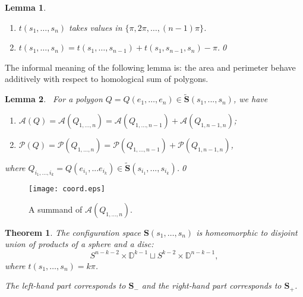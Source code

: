 \documentclass[12pt]{amsart}
\theoremstyle{plain}
\newtheorem{theorem}{Theorem}
\newtheorem{lemma}{Lemma}
\theoremstyle{definition}
\theoremstyle{remark}
\theoremstyle{plain}
\theoremstyle{definition}
\def\D{\mathbb{D}}
\begin{document}
\begin{lemma}
\label{turn}
\(\,\)
\begin{enumerate}

    \item \(t(s_1,\ldots,s_n)\) takes values in $\{\pi,2\pi, \dots, (n-1)\pi\}$.
    \item \(t(s_1,\ldots,s_n)=t(s_1,\ldots,s_{n-1})+t(s_1,s_{n-1},s_n)-\pi\).\qed

\end{enumerate}

\end{lemma}

The informal meaning of the following lemma is: the area and perimeter behave additively with respect to homological sum of polygons.
\begin{lemma}
\label{sum}
\(\,\)
For a polygon  \(Q=Q(e_1,\ldots,e_n)\in\widetilde{\mathbf{ S}}(s_1,...,s_n)\), we have
\begin{enumerate}
    \item \(\mathcal{A}(Q)= \mathcal{A}(Q_{1,\ldots,n})=\mathcal{A}(Q_{1,\ldots,n-1})+\mathcal{A}(Q_{1,n-1,n})\);
		\item  \(\mathcal{P}(Q)= \mathcal{P}(Q_{1,\ldots,n})=\mathcal{P}(Q_{1,\ldots,n-1})+\mathcal{P}(Q_{1,n-1,n})\),

\end{enumerate}
where $Q_{i_1,...,i_k}=Q(e_{i_1},...e_{i_k})\in \widetilde{\mathbf{S}}(s_{i_1},...,s_{i_k})$.\qed
\end{lemma}


\begin{figure}[h]
\centering \texttt{[image: coord.eps]}
\caption{A summand of $\mathcal{A}(Q_{1,\ldots,n})$.}\label{FigCoordinates}
\end{figure}


\begin{theorem}\label{ThmConfSpace}  The configuration space $\mathbf{S}(s_1,\ldots,s_n)$ is homeomorphic to disjoint union of products of a sphere and a disc:
$$
 S^{n-k-2}\times \D^{k-1}\sqcup S^{k-2} \times \D^{n-k-1}
,$$ where $t(s_1,\ldots,s_n)=k\pi$.

The left-hand  part corresponds to \(\mathbf{S}_-\) and the right-hand part corresponds to \(\mathbf{S}_+\).
\end{theorem}
\end{document}
